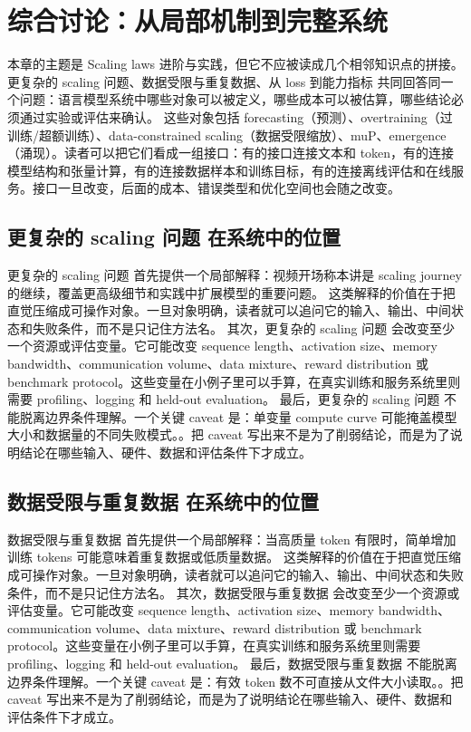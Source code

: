 \documentclass[a4paper]{article}
\begin{document}
\section{综合讨论：从局部机制到完整系统}
本章的主题是 Scaling laws 进阶与实践，但它不应被读成几个相邻知识点的拼接。更复杂的 scaling 问题、数据受限与重复数据、从 loss 到能力指标 共同回答同一个问题：语言模型系统中哪些对象可以被定义，哪些成本可以被估算，哪些结论必须通过实验或评估来确认。
这些对象包括 forecasting（预测）、overtraining（过训练/超额训练）、data-constrained scaling（数据受限缩放）、muP、emergence（涌现）。读者可以把它们看成一组接口：有的接口连接文本和 token，有的连接模型结构和张量计算，有的连接数据样本和训练目标，有的连接离线评估和在线服务。接口一旦改变，后面的成本、错误类型和优化空间也会随之改变。
\subsection{更复杂的 scaling 问题 在系统中的位置}
更复杂的 scaling 问题 首先提供一个局部解释：视频开场称本讲是 scaling journey 的继续，覆盖更高级细节和实践中扩展模型的重要问题。 这类解释的价值在于把直觉压缩成可操作对象。一旦对象明确，读者就可以追问它的输入、输出、中间状态和失败条件，而不是只记住方法名。
其次，更复杂的 scaling 问题 会改变至少一个资源或评估变量。它可能改变 sequence length、activation size、memory bandwidth、communication volume、data mixture、reward distribution 或 benchmark protocol。这些变量在小例子里可以手算，在真实训练和服务系统里则需要 profiling、logging 和 held-out evaluation。
最后，更复杂的 scaling 问题 不能脱离边界条件理解。一个关键 caveat 是：单变量 compute curve 可能掩盖模型大小和数据量的不同失败模式。。把 caveat 写出来不是为了削弱结论，而是为了说明结论在哪些输入、硬件、数据和评估条件下才成立。
\subsection{数据受限与重复数据 在系统中的位置}
数据受限与重复数据 首先提供一个局部解释：当高质量 token 有限时，简单增加训练 tokens 可能意味着重复数据或低质量数据。 这类解释的价值在于把直觉压缩成可操作对象。一旦对象明确，读者就可以追问它的输入、输出、中间状态和失败条件，而不是只记住方法名。
其次，数据受限与重复数据 会改变至少一个资源或评估变量。它可能改变 sequence length、activation size、memory bandwidth、communication volume、data mixture、reward distribution 或 benchmark protocol。这些变量在小例子里可以手算，在真实训练和服务系统里则需要 profiling、logging 和 held-out evaluation。
最后，数据受限与重复数据 不能脱离边界条件理解。一个关键 caveat 是：有效 token 数不可直接从文件大小读取。。把 caveat 写出来不是为了削弱结论，而是为了说明结论在哪些输入、硬件、数据和评估条件下才成立。
\end{document}
